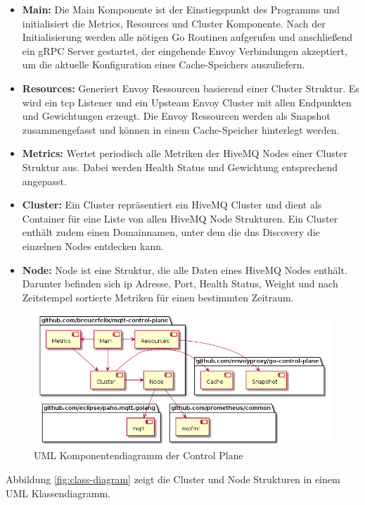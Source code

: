 \begin{itemize}
  \item \textbf{Main:} Die Main Komponente ist der Einstiegspunkt des Programms und initialisiert die Metrics, Resources und Cluster Komponente. Nach der Initialisierung werden alle nötigen Go Routinen aufgerufen und anschlie{\ss}end ein gRPC Server gestartet, der eingehende Envoy Verbindungen akzeptiert, um die aktuelle Konfiguration eines Cache-Speichers auszuliefern.
  \item \textbf{Resources:} Generiert Envoy Ressourcen basierend einer Cluster Struktur. Es wird ein \ac{tcp} Listener und ein Upsteam Envoy Cluster mit allen Endpunkten und Gewichtungen erzeugt. Die Envoy Ressourcen werden als Snapshot zusammengefasst und können in einem Cache-Speicher hinterlegt werden.
  \item \textbf{Metrics:} Wertet periodisch alle Metriken der HiveMQ Nodes einer Cluster Struktur aus. Dabei werden Health Status und Gewichtung entsprechend angepasst.
  \item \textbf{Cluster:} Ein Cluster repräsentiert ein HiveMQ Cluster und dient als Container für eine Liste von allen HiveMQ Node Strukturen. Ein Cluster enthält zudem einen Domainnamen, unter dem die \ac{dns} Discovery die einzelnen Nodes entdecken kann.
  \item \textbf{Node:} Node ist eine Struktur, die alle Daten eines HiveMQ Nodes enthält. Darunter befinden sich \ac{ip} Adresse, Port, Health Status, Weight und nach Zeitstempel sortierte Metriken für einen bestimmten Zeitraum.
\end{itemize}
\begin{figure}
    \centering
    \includegraphics[scale=0.5]{gen/component-diagram.png}
    \caption{UML Komponentendiagramm der Control Plane}
    \label{fig:component-diagram}
\end{figure}
Abbildung \ref{fig:class-diagram} zeigt die Cluster und Node Strukturen in einem UML Klassendiagramm.
